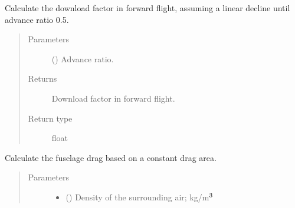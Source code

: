 \documentclass[letterpaper,10pt,english]{sphinxmanual}
\begin{document}
\begin{fulllineitems}
\begin{fulllineitems}
\begin{quote}
\begin{description}
\end{description}\end{quote}

\end{fulllineitems}


\begin{fulllineitems}
\label{\detokenize{modules/fuselage:fuselage.Fuselage.get_download_factor_in_flight}}
\sphinxAtStartPar
Calculate the download factor in forward flight, assuming a linear
decline until advance ratio 0.5.
\begin{quote}\begin{description}
\item[{Parameters}] \leavevmode
\sphinxAtStartPar
{} () \textendash{} Advance ratio.

\item[{Returns}] \leavevmode
\sphinxAtStartPar
Download factor in forward flight.

\item[{Return type}] \leavevmode
\sphinxAtStartPar
float

\end{description}\end{quote}

\end{fulllineitems}


\begin{fulllineitems}
\label{\detokenize{modules/fuselage:fuselage.Fuselage.get_fuselage_drag}}
\sphinxAtStartPar
Calculate the fuselage drag based on a constant drag area.
\begin{quote}\begin{description}
\item[{Parameters}] \leavevmode\begin{itemize}
\item {} 
\sphinxAtStartPar
{} () \textendash{} Density of the surrounding air; kg/m\(\sp{\text{3}}\)


\end{itemize}
\end{description}
\end{quote}
\end{fulllineitems}
\end{fulllineitems}
\end{document}
